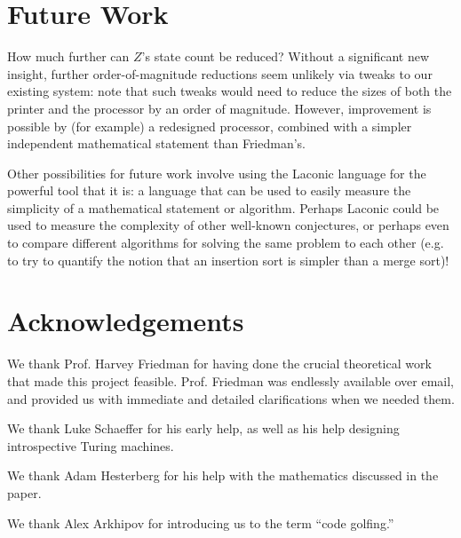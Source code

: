 \documentclass[11pt]{article}
\begin{document}
\section{Future Work}

How much further can $Z$'s state count be reduced? Without a significant new insight, further order-of-magnitude reductions seem unlikely via tweaks to our existing system: note that such tweaks would need to reduce the sizes of both the printer and the processor by an order of magnitude. However, improvement is possible by (for example) a redesigned processor, combined with a simpler independent mathematical statement than Friedman's. 

Other possibilities for future work involve using the Laconic language for the powerful tool that it is: a language that can be used to easily measure the simplicity of a mathematical statement or algorithm. Perhaps Laconic could be used to measure the complexity of other well-known conjectures, or perhaps even to compare different algorithms for solving the same problem to each other (e.g. to try to quantify the notion that an insertion sort is simpler than a merge sort)!

\section{Acknowledgements}


We thank Prof. Harvey Friedman for having done the crucial theoretical work that made this project feasible. Prof. Friedman was endlessly available over email, and provided us with immediate and detailed clarifications when we needed them.

We thank Luke Schaeffer for his early help, as well as his help designing introspective Turing machines. 

We thank Adam Hesterberg for his help with the mathematics discussed in the paper.

We thank Alex Arkhipov for introducing us to the term ``code golfing.''
\end{document}
